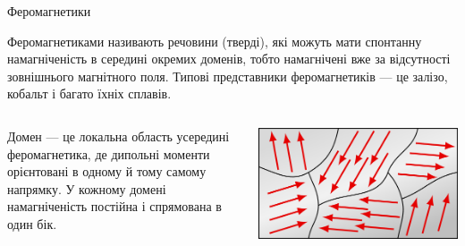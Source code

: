 \documentclass[onlytextwidth]{beamer}
\begin{document}
\begin{frame}{Феромагнетики}{}
	\begin{block}{}
		\alert{Феромагнетиками} називають речовини (тверді), які можуть мати \alert{спонтанну намагніченість в середині окремих доменів}, тобто
		намагнічені вже за відсутності зовнішнього магнітного поля. Типові представники феромагнетиків --- це залізо, кобальт і багато їхніх сплавів.
	\end{block}
	\begin{columns}
		\begin{column}{0.65\linewidth}
			\begin{block}{}\justifying\small
				\alert{Домен} --- це локальна область усередині феромагнетика, де дипольні моменти
				орієнтовані в одному й тому самому напрямку. У кожному домені намагніченість постійна і спрямована
				в один бік.
			\end{block}
		\end{column}
		\begin{column}{0.3\linewidth}\centering
			\includegraphics[width=1\linewidth]{domains}
		\end{column}
	\end{columns}
\end{frame}
\end{document}
